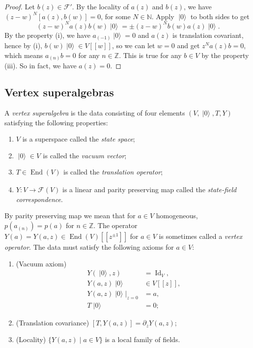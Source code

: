 \documentclass[a4paper, 12pt, reqno]{amsart}
\theoremstyle{remark}
\numberwithin{equation}{subsection}
\DeclareMathOperator{\Id}{Id}
\DeclareMathOperator{\End}{End}
\DeclareMathOperator{\vac}{|0\rangle}
\DeclareMathOperator{\zero}{\overline{0}}
\begin{document}
\begin{proof}
  Let $b(z) \in \mathcal{F}'$.
  By the locality of $a(z)$ and $b(z)$, we have $(z - w)^N[a(z), b(w)] = 0$, for some $N \in \mathbb{N}$.
  Apply $\vac$ to both sides to get
  \begin{equation*}
    (z - w)^Na(z)b(w)\vac = \pm(z - w)^Nb(w)a(z)\vac.
  \end{equation*}
  By the property (i), we have $a_{(-1)}\vac = 0$ and $a(z)$ is translation covariant, hence by (i), $b(w)\vac \in V[[w]]$, so we can let $w = 0$ and get $z^Na(z)b = 0$, which means $a_{(n)}b = 0$ for any $n \in \mathbb{Z}$.
  This is true for any $b \in V$ by the property (iii).
  So in fact, we have $a(z) = 0$.
\end{proof}

\subsection{Vertex superalgebras}
\label{sec:vertex-superalgebras}

A \emph{vertex superalgebra} is the data consisting of four elements $(V, \vac, T, Y)$ satisfying the following properties:
\begin{enumerate}
\item $V$ is a superspace called the \emph{state space};
\item $\vac \in V_{\zero}$ is called the \emph{vacuum vector};
\item $T \in \End(V)_{\zero}$ is called the \emph{translation operator};
\item $Y: V \to \mathcal{F}(V)$ is a linear and parity preserving map called the \emph{state-field correspondence}.
\end{enumerate}
By parity preserving map we mean that for $a \in V$ homogeneous, $p(a_{(n)}) = p(a)$ for $n \in \mathbb{Z}$.
The operator $Y(a) = Y(a, z) \in \End(V)[[z^{\pm 1}]]$ for $a \in V$ is sometimes called a \emph{vertex operator}.
The data must satisfy the following axioms for $a \in V$:
\begin{enumerate}
\item (Vacuum axiom)
  \begin{align*}
    Y(\vac,z) &= \Id_V, \\
    Y(a, z)\vac &\in V[[z]], \\
    Y(a, z)\vac|_{z = 0} &= a, \\
    T\vac &= 0;
  \end{align*}
\item (Translation covariance) $[T, Y(a, z)] = \partial_zY(a, z)$;
\item (Locality) $\{Y(a, z) \mid a \in V\}$ is a local family of fields.
\end{enumerate}
\end{document}

